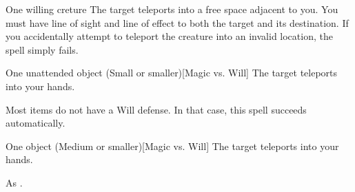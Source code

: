 \begin{spellheader}
    \spellrng{\rngmed}
\end{spellheader}
\begin{spelleffects}
    \begin{spelltarget}{One willing creture}
        \spelleffect The target teleports into a free space adjacent to you. You must have line of sight and line of effect to both the target and its destination. If you accidentally attempt to teleport the creature into an invalid location, the spell simply fails.
    \end{spelltarget}
\end{spelleffects}

\begin{spellheader}
    \spellrng{\rngclose}
\end{spellheader}
\begin{spelleffects}
    \begin{spelltarget}{One unattended object (Small or smaller)}[Magic vs. Will]
        \spellsuccess The target teleports into your hands.
    \end{spelltarget}
\end{spelleffects}
\begin{spellfooter}
    \spellnotes Most items do not have a Will defense. In that case, this spell succeeds automatically.
\end{spellfooter}

\begin{spellheader}
    \spellrng{\rngmed}
\end{spellheader}
\begin{spelleffects}
    \begin{spelltarget}{One object (Medium or smaller)}[Magic vs. Will]
        \spelleffect The target teleports into your hands.
    \end{spelltarget}
\end{spelleffects}
\begin{spellfooter}
    \spellnotes As .
\end{spellfooter}

